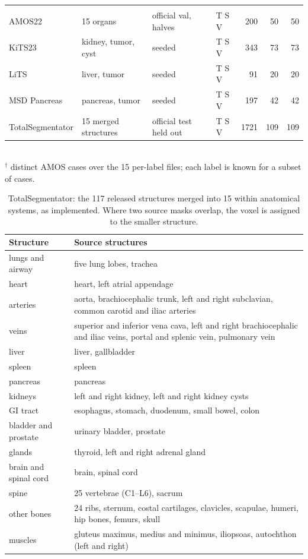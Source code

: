 \begin{table}[htbp]
{\begin{tabular}{@{}llllrrr@{}}
\addlinespace[2pt]
\multicolumn{7}{@{}l}{\textit{Segmentation}} \\
AMOS22 & 15 organs & official val, halves & T S V & 200 & 50 & 50 \\
KiTS23 & kidney, tumor, cyst & seeded & T S V & 343 & 73 & 73 \\
LiTS & liver, tumor & seeded & T S V & 91 & 20 & 20 \\
MSD Pancreas & pancreas, tumor & seeded & T S V & 197 & 42 & 42 \\
TotalSegmentator & 15 merged structures & official test held out & T S V & 1721 & 109 & 109 \\
\bottomrule
\end{tabular}}
\\[2pt]{\footnotesize $^\dagger$ distinct AMOS cases over the 15 per-label files; each label is known for a subset of cases.}
\end{table}

\begin{table}[htbp]
\centering
\caption{TotalSegmentator: the 117 released structures merged into 15 within anatomical systems, as implemented. Where two source masks overlap, the voxel is assigned to the smaller structure.}
\label{tab:totalseg}
\small
\begin{tabular}{@{}lp{}@{}}
\toprule
Structure & Source structures \\
\midrule
lungs and airway & five lung lobes, trachea \\
heart & heart, left atrial appendage \\
arteries & aorta, brachiocephalic trunk, left and right subclavian, common carotid and iliac arteries \\
veins & superior and inferior vena cava, left and right brachiocephalic and iliac veins, portal and splenic vein, pulmonary vein \\
liver & liver, gallbladder \\
spleen & spleen \\
pancreas & pancreas \\
kidneys & left and right kidney, left and right kidney cysts \\
GI tract & esophagus, stomach, duodenum, small bowel, colon \\
bladder and prostate & urinary bladder, prostate \\
glands & thyroid, left and right adrenal gland \\
brain and spinal cord & brain, spinal cord \\
spine & 25 vertebrae (C1--L6), sacrum \\
other bones & 24 ribs, sternum, costal cartilages, clavicles, scapulae, humeri, hip bones, femurs, skull \\
muscles & gluteus maximus, medius and minimus, iliopsoas, autochthon (left and right) \\
\bottomrule
\end{tabular}
\end{table}

